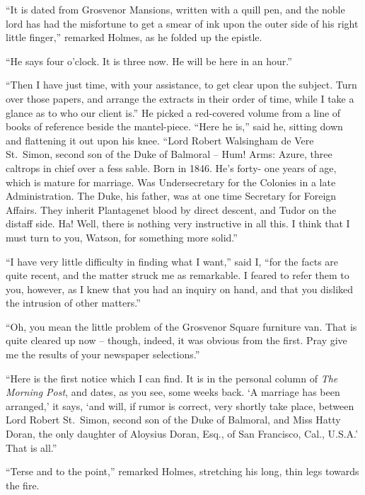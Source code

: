 “It is dated from Grosvenor Mansions, written with a quill
pen, and the noble lord has had the misfortune to get a smear
of ink upon the outer side of his right little finger,” remarked
Holmes, as he folded up the epistle.

“He says four o’clock. It is three now. He will be here
in an hour.”

“Then I have just time, with your assistance, to get clear
upon the subject. Turn over those papers, and arrange the
extracts in their order of time, while I take a glance as to
who our client is.” He picked a red-covered volume from
a line of books of reference beside the mantel-piece. “Here
he is,” said he, sitting down and flattening it out upon his
knee. “Lord Robert Walsingham de Vere St.~Simon, second
son of the Duke of Balmoral -- Hum! Arms: Azure, three
caltrops in chief over a fess sable. Born in 1846. He’s forty-%
one years of age, which is mature for marriage. Was Undersecretary
for the Colonies in a late Administration. The
Duke, his father, was at one time Secretary for Foreign Affairs.
They inherit Plantagenet blood by direct descent, and
Tudor on the distaff side. Ha! Well, there is nothing very
instructive in all this. I think that I must turn to you, Watson,
for something more solid.”

“I have very little difficulty in finding what I want,” said
I, “for the facts are quite recent, and the matter struck me
as remarkable. I feared to refer them to you, however, as I
knew that you had an inquiry on hand, and that you disliked
the intrusion of other matters.”

“Oh, you mean the little problem of the Grosve\-nor Square
furniture van. That is quite cleared up now -- though, indeed,
it was obvious from the first. Pray give me the results
of your newspaper selections.”

“Here is the first notice which I can find. It is in the
personal column of \textit{The Morning Post}, and dates, as you see,
some weeks back. ‘A marriage has been arranged,’ it says,
‘and will, if rumor is correct, very shortly take place, between
Lord Robert St.~Simon, second son of the Duke of Balmoral,
and Miss Hatty Doran, the only daughter of Aloysius Doran,
Esq., of San Francisco, Cal., U.S.A.’ That is all.”

“Terse and to the point,” remarked Holmes, stretching
his long, thin legs towards the fire.

